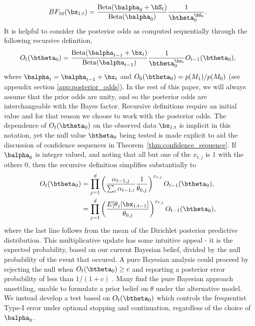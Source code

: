 \documentclass[11pt]{article}
\newcommand{\Beta}{\mathrm{Beta}}
\begin{document}
\begin{equation}
  \label{eq:simplified_bayes_factor}
 BF_{10}(\bx_{1:t}) = \frac{\Beta(\balpha_0 + \bS_t)}{\Beta(\balpha_0)}\frac{1}{\btheta_0^{\bS_t}}.
\end{equation}
It is helpful to consider the posterior odds as computed sequentially through the following recursive definition,
\begin{equation}
  \label{eq:update_rule}
  O_{t}(\btheta_0) = \frac{\Beta(\balpha_{t-1} + \bx_t)}{\Beta(\balpha_{t-1})}\frac{1}{\btheta_0^{\bx_t}} O_{t-1}(\btheta_0),
\end{equation}
where $\balpha_t = \balpha_{t-1}+\bx_t$ and $O_0(\btheta_0)=p(M_1)/p(M_0)$ (see appendix section \ref{app:posterior_odds}).
In the rest of this paper, we will always assume that the prior odds are unity, and so the posterior odds are interchangeable with the Bayes factor.
Recursive definitions require an initial value and for that reason we choose to work with the posterior odds.
The dependence of $O_t(\btheta_0)$ on the observed data $\bx_{1:t}$ is implicit in this notation, yet the null value $\btheta_0$ being tested is made explicit to aid the discussion of confidence sequences in Theorem~\ref{thm:confidence_sequence}.
If $\balpha_0$ is integer valued, and noting that all but one of the $x_{t,j}$ is 1 with the others 0, then the recursive definition simplifies substantially to
\begin{align}
  \label{eq:simplified_bayes_factor}
  O_{t}(\btheta_0) &= \prod_{j=1}^{d} \left(\frac{\alpha_{t-1,j}}{\sum_i \alpha_{t-1,i}} \frac{1}{\theta_{0,j}}\right)^{x_{t,j}} O_{t-1}(\btheta_0),\\
  &=\prod_{j=1}^{d}\left(\frac{E[\theta_j|\bx_{1:t-1}]}{\theta_{0,j}} \right)^{x_{t,j}} O_{t-1}(\btheta_0),
\end{align}
where the last line follows from the mean of the Dirichlet posterior predictive distribution.
This multiplicative update has some intuitive appeal - it is the expected probability, based on our current Bayesian belief, divided by the null probability of the event that occured.
A pure Bayesian analysis could proceed by rejecting the null when $O_t(\btheta_0) \geq c$ and reporting a posterior error probability of less than $1/(1+c)$ \citep[Chapter 5]{bernardo}.
Many find the pure Bayesian approach unsettling, unable to formulate a prior belief on $\theta$ under the alternative model.
We instead develop a test based on $O_t(\btheta_0)$ which controls the frequentist Type-I error under optional stopping and continuation, regardless of the choice of $\balpha_0$.
\end{document}
